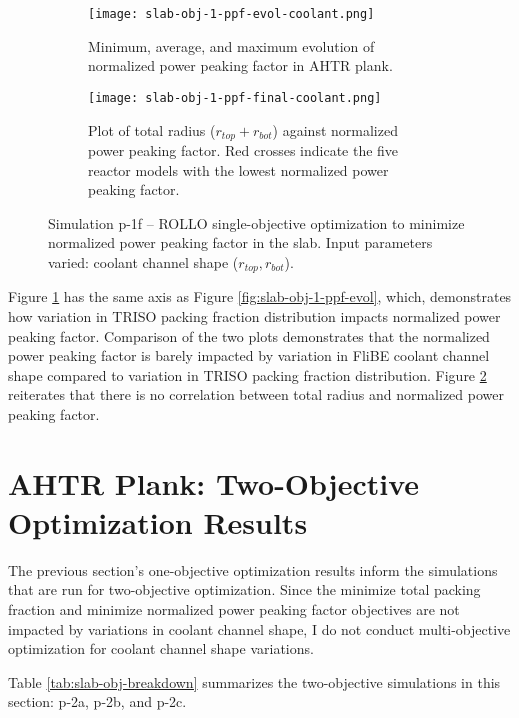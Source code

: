 \begin{figure}[htbp]
    \centering
    \begin{subfigure}{\textwidth}
        \texttt{[image: slab-obj-1-ppf-evol-coolant.png]}
        \caption{Minimum, average, and maximum evolution of normalized power 
        peaking factor in AHTR plank.}
        \label{fig:slab-obj-1-ppf-evol-coolant} 
    \end{subfigure}
    \begin{subfigure}{\textwidth}
        \texttt{[image: slab-obj-1-ppf-final-coolant.png]}
        \caption{Plot of total radius ($r_{top} + r_{bot}$) against normalized 
        power peaking factor. Red crosses indicate the five reactor models with the 
        lowest normalized power peaking factor.}
        \label{fig:slab-obj-1-ppf-final-coolant} 
    \end{subfigure}
    \caption{Simulation p-1f -- ROLLO single-objective optimization to minimize normalized power 
    peaking factor in the slab. Input parameters varied: coolant channel shape 
    ($r_{top}, r_{bot}$).}
    \label{fig:slab-obj-1-ppf-coolant}
\end{figure}
Figure \ref{fig:slab-obj-1-ppf-evol-coolant} has the same axis as Figure 
\ref{fig:slab-obj-1-ppf-evol}, which, demonstrates how variation in TRISO packing fraction 
distribution impacts normalized power peaking factor. 
Comparison of the two plots demonstrates that the normalized power
peaking factor is barely impacted by variation in FliBE coolant channel shape compared 
to variation in TRISO packing fraction distribution.
Figure \ref{fig:slab-obj-1-ppf-final-coolant} reiterates that there is no correlation 
between total radius and normalized power peaking factor. 

\section{AHTR Plank: Two-Objective Optimization Results}
The previous section's one-objective optimization results inform the simulations that 
are run for two-objective optimization. 
Since the minimize total packing fraction and minimize normalized power peaking factor 
objectives are not impacted by variations in coolant channel shape, I do not conduct 
multi-objective optimization for coolant channel shape variations.  

Table \ref{tab:slab-obj-breakdown} summarizes the two-objective simulations in this 
section: p-2a, p-2b, and p-2c.

